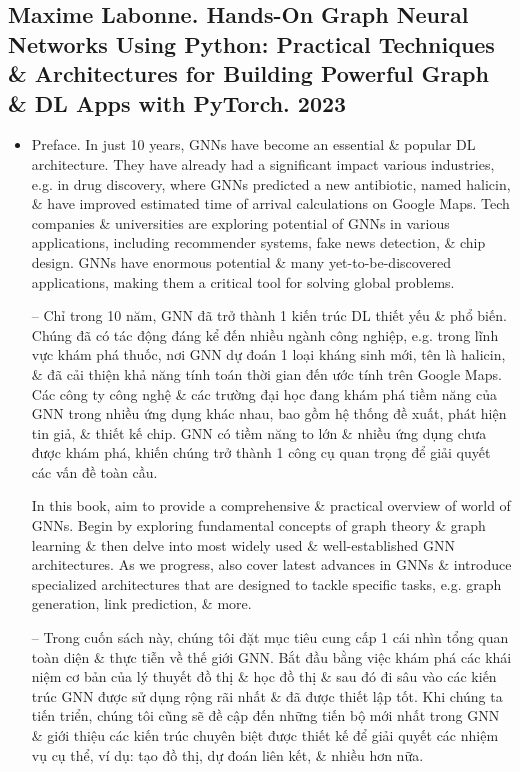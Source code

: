\documentclass{article}
\begin{document}

\subsection{{\sc Maxime Labonne}. Hands-On Graph Neural Networks Using Python: Practical Techniques \& Architectures for Building Powerful Graph \& DL Apps with PyTorch. 2023}

\begin{itemize}
    \item {\sf Preface.} In just 10 years, GNNs have become an essential \& popular DL architecture. They have already had a significant impact various industries, e.g. in drug discovery, where GNNs predicted a new antibiotic, named halicin, \& have improved estimated time of arrival calculations on Google Maps. Tech companies \& universities are exploring potential of GNNs in various applications, including recommender systems, fake news detection, \& chip design. GNNs have enormous potential \& many yet-to-be-discovered applications, making them a critical tool for solving global problems.

    -- Chỉ trong 10 năm, GNN đã trở thành 1 kiến trúc DL thiết yếu \& phổ biến. Chúng đã có tác động đáng kể đến nhiều ngành công nghiệp, e.g. trong lĩnh vực khám phá thuốc, nơi GNN dự đoán 1 loại kháng sinh mới, tên là halicin, \& đã cải thiện khả năng tính toán thời gian đến ước tính trên Google Maps. Các công ty công nghệ \& các trường đại học đang khám phá tiềm năng của GNN trong nhiều ứng dụng khác nhau, bao gồm hệ thống đề xuất, phát hiện tin giả, \& thiết kế chip. GNN có tiềm năng to lớn \& nhiều ứng dụng chưa được khám phá, khiến chúng trở thành 1 công cụ quan trọng để giải quyết các vấn đề toàn cầu.

    In this book, aim to provide a comprehensive \& practical overview of world of GNNs. Begin by exploring fundamental concepts of graph theory \& graph learning \& then delve into most widely used \& well-established GNN architectures. As we progress, also cover latest advances in GNNs \& introduce specialized architectures that are designed to tackle specific tasks, e.g. graph generation, link prediction, \& more.

    -- Trong cuốn sách này, chúng tôi đặt mục tiêu cung cấp 1 cái nhìn tổng quan toàn diện \& thực tiễn về thế giới GNN. Bắt đầu bằng việc khám phá các khái niệm cơ bản của lý thuyết đồ thị \& học đồ thị \& sau đó đi sâu vào các kiến trúc GNN được sử dụng rộng rãi nhất \& đã được thiết lập tốt. Khi chúng ta tiến triển, chúng tôi cũng sẽ đề cập đến những tiến bộ mới nhất trong GNN \& giới thiệu các kiến trúc chuyên biệt được thiết kế để giải quyết các nhiệm vụ cụ thể, ví dụ: tạo đồ thị, dự đoán liên kết, \& nhiều hơn nữa.


\end{itemize}
\end{document}
